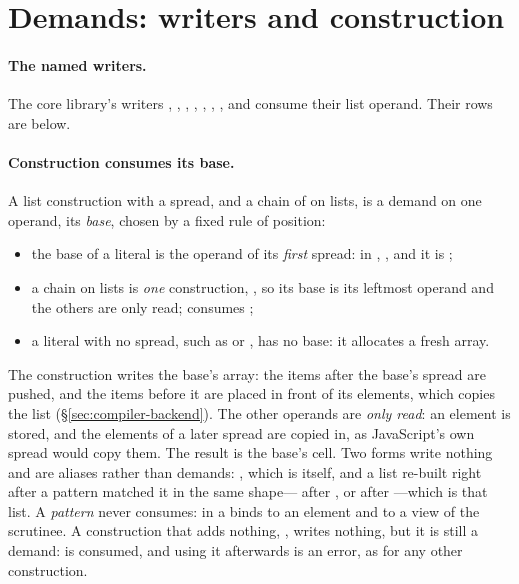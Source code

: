 \section{Demands: writers and construction}
\label{sec:model-demands}

\paragraph{The named writers.} The core library's writers , , ,
, , , ,  and  consume their
list operand. Their rows are below.

\paragraph{Construction consumes its base.} A list construction with a spread, and a chain of \code{++}
on lists, is a demand on one operand, its \emph{base}, chosen by a fixed rule of position:
\begin{itemize}
\item the base of a literal is the operand of its \emph{first} spread: in \code{[ x, …acc ]},
\code{[ …acc, x ]}, \code{[ …acc, …ys ]} and \code{[ a, …acc, b, …ys ]} it is ;
\item a chain  on lists is \emph{one} construction, \code{[ …a, …b, ⋯, …z ]}, so
its base is its leftmost operand and the others are only read;  consumes ;
\item a literal with no spread, such as \code{[ x, y ]} or \code{[]}, has no base: it allocates a fresh
array.
\end{itemize}
The construction writes the base's array: the items after the base's spread are pushed, and the items
before it are placed in front of its elements, which copies the list (\S\ref{sec:compiler-backend}). The
other operands are \emph{only read}: an element is stored, and the elements of a later spread are copied
in, as JavaScript's own spread would copy them. The result is the base's cell. Two forms write nothing
and are aliases rather than demands: \code{[ …xs ]}, which is  itself, and a list re-built right
after a pattern matched it in the same shape---\code{[ h, …t ]} after \code{[ h, …t ]}, or
 after ---which is that list. A \emph{pattern} never
consumes: \code{[ x, …rest ]} in a  binds  to an element and  to a view of
the scrutinee. A construction that adds nothing, , writes nothing, but it is still a
demand:  is consumed, and using it afterwards is an error, as for any other construction.

